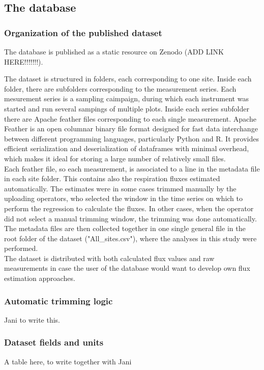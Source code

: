 \documentclass[12pt,a4paper]{article}
\begin{document}
\subsection{The database}

\subsubsection{Organization of the published dataset}
The database is published as a static resource on Zenodo (ADD LINK HERE!!!!!!!).

The dataset is structured in folders, each corresponding to one site. Inside each folder, there are subfolders corresponding to the measurement series. Each mesurement series is a sampling caimpaign, during which each instrument was started and run several sampings of multiple plots.
Inside each series subfolder there are Apache feather files corresponding to each single measurement. 
Apache Feather is an open columnar binary file format designed for fast data interchange between different programming languages, particularly Python and R. It provides efficient serialization and deserialization of dataframes with minimal overhead, 
which makes it ideal for storing a large number of relatively small files.\\

Each feather file, so each measurement, is associated to a line in the metadata file in each site folder. This contains also the respiration fluxes estimated automatically. The estimates were in some cases trimmed manually by the uploading operators, who selected the window in the time series on which to perform the regression to calculate the fluxes. In other cases, when the operator did not select a manual trimming window, the trimming was done automatically.
The metadata files are then collected together in one single general file in the root folder of the dataset ("All_sites.csv"), where the analyses in this study were performed.\\

The dataset is distributed with both calculated flux values and raw measurements in case the user of the database would want to develop own flux estimation approaches.

\subsubsection{Automatic trimming logic}
Jani to write this.

\subsubsection{Dataset fields and units}
A table here, to write together with Jani
\end{document}
